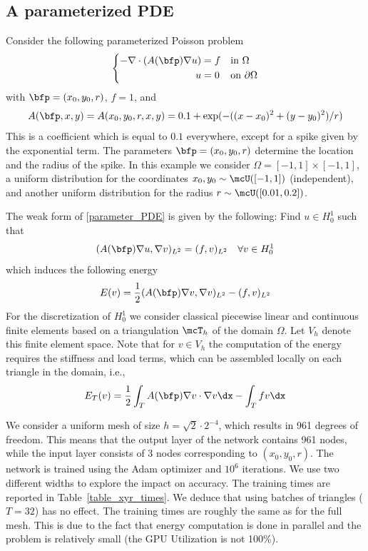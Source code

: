 \documentclass[12pt]{article}
\begin{document}
\subsection{A parameterized PDE}\label{ex:parameter}
Consider the following parameterized Poisson problem
\begin{equation}
\left\{
\begin{alignedat}{2}
	-\nabla \cdot(A(\bfp)  \nabla u) &= f \quad &&\text{in } \Omega \\
	u &= 0 &&\text{on } \partial \Omega
\end{alignedat}
\right.
\label{parameter_PDE}
\end{equation}
with $\bfp = (x_0,y_0,r)$, $f=1$, and
\begin{align}
	A(\bfp,x,y) = A(x_0,y_0,r,x,y) = 0.1 + \exp(-((x-x_0)^2 + (y-y_0)^2)/r)
\end{align}
This is a coefficient which is equal to $0.1$ everywhere, except for a spike given by the exponential term. The parameters $\bfp = (x_0,y_0,r)$ determine the location and the radius of the spike. In this example we consider $\Omega = [-1,1]\times[-1,1]$, a uniform distribution for the coordinates $x_0,y_0 \sim \mcU([-1,1])$ (independent), and another uniform distribution for the radius $r \sim \mcU([0.01,0.2])$.

The weak form of \eqref{parameter_PDE} is given by the following: Find $u \in H^1_0$ such that
\begin{align}
	(A(\bfp)\nabla u, \nabla v)_{L^2} = (f, v)_{L^2} \quad \forall v \in H^1_0
\end{align}
which induces the following energy
\begin{align}
	E(v) = \frac{1}{2}(A(\bfp)\nabla v, \nabla v)_{L^2} - (f, v)_{L^2}
\end{align}
For the discretization of $H^1_0$ we consider classical piecewise linear and continuous finite elements based on a  triangulation $\mcT_h$ of the domain $\Omega$. Let $V_h$ denote this finite element space. Note that for $v \in V_h$ the computation of the energy requires the stiffness and load terms, which can be assembled locally on each triangle in the domain, i.e.,
\begin{align}
	E_T(v) = \frac{1}{2} \int_T A(\bfp)\nabla v \cdot \nabla v \dx - \int_T fv \dx
\end{align}

We consider a uniform mesh of size $h=\sqrt{2}\cdot 2^{-4}$, which results in 961 degrees of freedom. This means that the output layer of the network contains 961 nodes, while the input layer consists of 3 nodes corresponding to $(x_0,y_0,r)$. The network is trained using the Adam optimizer and $10^6$ iterations. We use two different widths to explore the impact on accuracy. The training times are reported in Table~\ref{table_xyr_times}. We deduce that using batches of triangles ($T=32$) has no effect. The training times are roughly the same as for the full mesh. This is due to the fact that energy computation is done in parallel and the problem is relatively small (the GPU Utilization is not 100\%).
\end{document}
